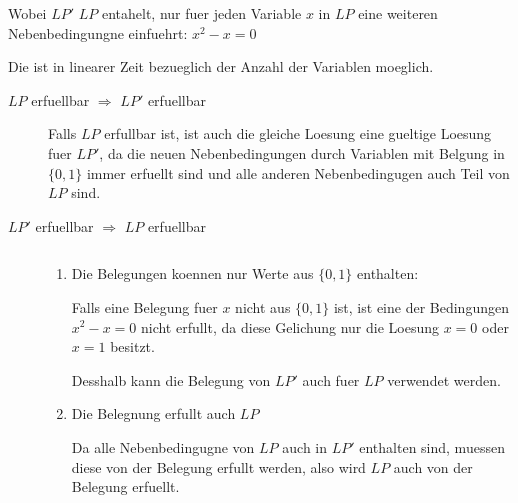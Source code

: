 Wobei $LP'$ $LP$ entahelt, nur fuer jeden Variable $x$ in $LP$
eine weiteren Nebenbedingungne einfuehrt: $x^2 - x = 0$

Die ist in linearer Zeit bezueglich der Anzahl der Variablen moeglich.

\begin{description}
\item[$LP$ erfuellbar $\Rightarrow$ $LP'$ erfuellbar]
Falls $LP$ erfullbar ist, ist auch die gleiche Loesung eine gueltige Loesung fuer $LP'$,
da die neuen Nebenbedingungen durch Variablen mit Belgung in $\{0,1\}$ immer erfuellt sind
und alle anderen Nebenbedingugen auch Teil von $LP$ sind.

\item[$LP'$ erfuellbar $\Rightarrow$ $LP$ erfuellbar] $ $

\begin{enumerate}
\item Die Belegungen koennen nur Werte aus $\{0,1\}$ enthalten:

    Falls eine Belegung fuer $x$ nicht aus $\{0,1\}$ ist,
    ist eine der Bedingungen $x^2 - x = 0$ nicht erfullt, 
    da diese Gelichung nur die Loesung $x=0$ oder $x=1$ besitzt.

    Desshalb kann die Belegung von $LP'$ auch fuer $LP$ verwendet werden.

\item Die Belegnung erfullt auch $LP$

    Da alle Nebenbedingugne von $LP$ auch in $LP'$ enthalten sind,
    muessen diese von der Belegung erfullt werden, also wird $LP$ auch von der Belegung erfuellt.

\end{enumerate}
\end{description}


